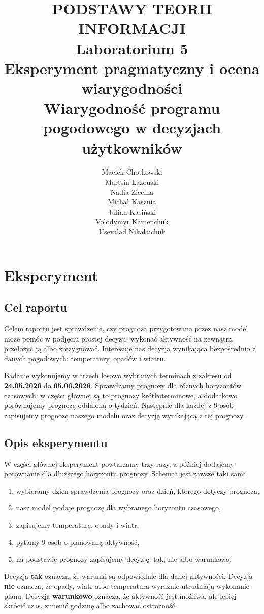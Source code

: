 \documentclass[a4paper,12pt]{article}
\title{
    \vspace{1.5cm}
    \textbf{PODSTAWY TEORII INFORMACJI}\\
    \vspace{1.5cm}
    Laboratorium 5\\
    Eksperyment pragmatyczny i ocena wiarygodności\\
    \vspace{1.5cm}
    \huge \textbf{Wiarygodność programu pogodowego w decyzjach użytkowników}\\
    \vspace{1cm}
}
\author{
Maciek Chotkowski \\ Martsin Lazouski \\ Nadia Ziecina \\
Michał Kasznia \\ Julian Kasiński \\ Volodymyr Kamenchuk \\ Usevalad Nikalaichuk
}
\date{}
\begin{document}
\maketitle
\newpage

\tableofcontents
\newpage

\section{Eksperyment}

\subsection{Cel raportu}

Celem raportu jest sprawdzenie, czy prognoza przygotowana przez nasz model może
pomóc w podjęciu prostej decyzji: wykonać aktywność na zewnątrz, przełożyć ją
albo zrezygnować. Interesuje nas decyzja wynikająca bezpośrednio z danych
pogodowych: temperatury, opadów i wiatru.

\noindent
Badanie wykonujemy w trzech losowo wybranych terminach z zakresu od
\textbf{24.05.2026} do \textbf{05.06.2026}. Sprawdzamy prognozy dla różnych
horyzontów czasowych: w części głównej są to prognozy krótkoterminowe, a
dodatkowo porównujemy prognozę oddaloną o tydzień. Następnie dla każdej z 9 osób
zapisujemy prognozę naszego modelu oraz decyzję wynikającą z tej prognozy.

\subsection{Opis eksperymentu}

W części głównej eksperyment powtarzamy trzy razy, a później dodajemy porównanie
dla dłuższego horyzontu prognozy. Schemat jest zawsze taki sam:

\begin{enumerate}
    \item wybieramy dzień sprawdzenia prognozy oraz dzień, którego dotyczy prognoza,
    \item nasz model podaje prognozę dla wybranego horyzontu czasowego,
    \item zapisujemy temperaturę, opady i wiatr,
    \item pytamy 9 osób o planowaną aktywność,
    \item na podstawie prognozy zapisujemy decyzję: tak, nie albo warunkowo.
\end{enumerate}

\noindent
Decyzja \textbf{tak} oznacza, że warunki są odpowiednie dla danej aktywności.
Decyzja \textbf{nie} oznacza, że opady, wiatr albo temperatura wyraźnie
utrudniają wykonanie planu. Decyzja \textbf{warunkowo} oznacza, że aktywność jest
możliwa, ale lepiej skrócić czas, zmienić godzinę albo zachować ostrożność.
\end{document}
